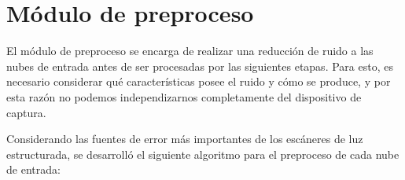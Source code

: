\section{Módulo de preproceso}
El módulo de preproceso se encarga de realizar una reducción de ruido a las nubes de entrada
antes de ser procesadas por las siguientes etapas.
Para esto, es necesario considerar qué características posee el ruido y cómo se produce,
y por esta razón no podemos independizarnos completamente del dispositivo de captura.

Considerando las fuentes de error más importantes de los escáneres de luz estructurada, se desarrolló
el siguiente algoritmo para el preproceso de cada nube de entrada:
